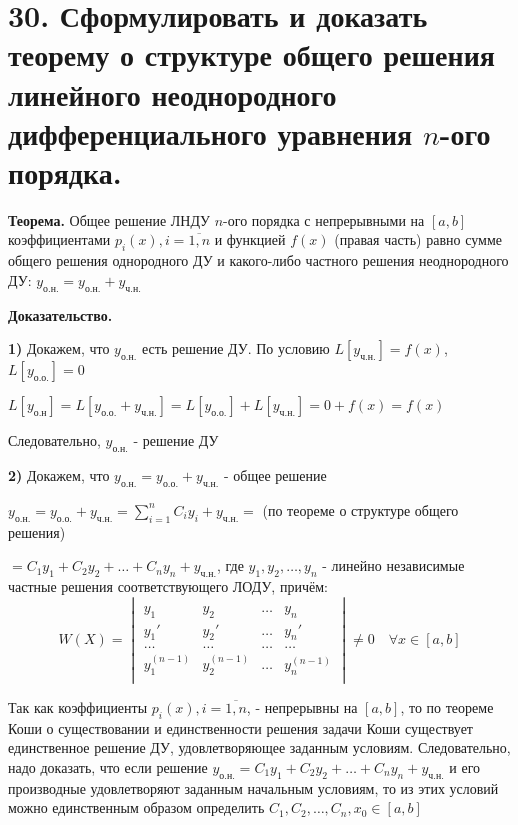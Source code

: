 \documentclass[11pt]{article}
\begin{document}
\section*{30. Сформулировать и доказать теорему о структуре общего решения линейного неоднородного дифференциального уравнения $n$-ого порядка.}
\par\textbf{Теорема.} Общее решение ЛНДУ $n$-ого порядка с непрерывными на $[a, b]$ коэффициентами $p_{i}(x), i = \overline{1, n}$ и функцией $f(x)$ (правая часть) равно сумме общего решения однородного ДУ и какого-либо частного решения неоднородного ДУ: $y_{\text{о.н.}} = y_{\text{о.н.}} + y_{\text{ч.н.}}$
\par\textbf{Доказательство.}
\par\textbf{1)} Докажем, что $y_{\text{о.н.}}$ есть решение ДУ. По условию $L[y_{\text{ч.н.}}] = f(x)$, $L[y_{\text{о.о.}}] = 0$
\par $L[y_{\text{о.н}}] = L[y_{\text{о.о.}} + y_{\text{ч.н.}}] = L[y_{\text{о.о.}}] + L[y_{\text{ч.н.}}] = 0 + f(x) = f(x)$
\par Следовательно, $y_{\text{о.н.}}$ - решение ДУ
\par\textbf{2)} Докажем, что $y_{\text{о.н.}} = y_{\text{о.о.}} + y_{\text{ч.н.}}$ - общее решение
\par $y_{\text{о.н.}} = y_{\text{о.о.}} + y_{\text{ч.н.}} = \sum_{i=1}^n C_{i} y_{i} + y_{\text{ч.н.}} =$ (по теореме о структуре общего решения)
\par $= C_{1}y_{1} + C_{2}y_{2} + \dots + C_{n} y_{n} + y_{\text{ч.н.}}$, где $y_{1}, y_{2}, \dots, y_{n}$ - линейно независимые частные решения соответствующего ЛОДУ, причём:
$$W(X) = \begin{vmatrix}{} \\
y_{1} & y_{2} & \dots & y_{n} \\
y_{1}' & y_{2}' & \dots & y_{n}' \\
\dots & \dots & \dots & \dots \\
y_{1}^{(n-1)} & y_{2}^{(n-1)} & \dots & y_{n}^{(n-1)} \\
\end{vmatrix} \neq 0 \quad \forall x \in [a, b]$$
\par Так как коэффициенты $p_i(x), i = \overline{1, n}$, - непрерывны на $[a, b]$, то по теореме Коши о существовании и единственности решения задачи Коши существует единственное решение ДУ, удовлетворяющее заданным условиям. Следовательно, надо доказать, что если решение $y_{\text{о.н.}} = C_{1}y_{1} + C_{2}y_{2} + \dots + C_{n} y_{n} + y_{\text{ч.н.}}$ и его производные удовлетворяют заданным начальным условиям, то из этих условий можно единственным образом определить $C_{1}, C_{2}, \dots, C_{n}, x_{0} \in [a, b]$
\end{document}
